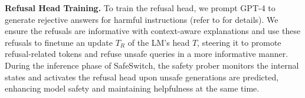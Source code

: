 \textbf{Refusal Head Training.} To train the refusal head, we prompt GPT-4 to generate rejective answers for harmful instructions (refer to  for details). We ensure the refusals are informative with context-aware explanations and use these refusals to finetune an update $T_R$ of the LM's head $T$, steering it to promote refusal-related tokens and refuse unsafe queries in a more informative manner. During the inference phase of SafeSwitch, the safety prober monitors the internal states and activates the refusal head upon unsafe generations are predicted, enhancing model safety and maintaining helpfulness at the same time.




